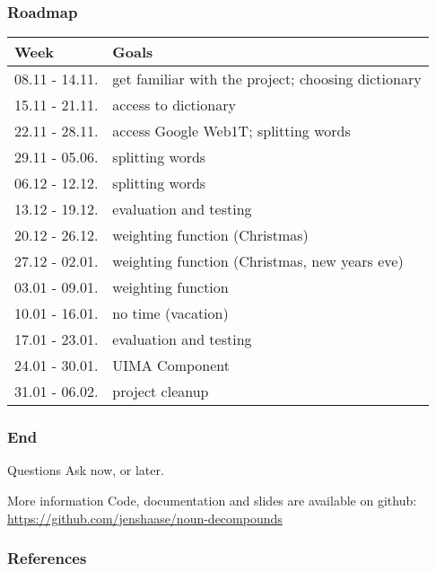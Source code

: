 \documentclass[accentcolor=tud9b, colorbacktitle, inverttitle]{tudbeamer}
\begin{document}
\begin{frame}
  \frametitle{Roadmap}

  \begin{tabular}{|l|l|}
  \hline
  \textbf{Week} & \textbf{Goals} \\ \hline
  08.11 - 14.11. & get familiar with the project; choosing dictionary \\ \hline
  15.11 - 21.11. & access to dictionary \\ \hline
  22.11 - 28.11. & access Google Web1T; splitting words \\ \hline
  29.11 - 05.06. & splitting words \\ \hline
  06.12 - 12.12. & splitting words \\ \hline
  13.12 - 19.12. & evaluation and testing \\ \hline
  20.12 - 26.12. & weighting function (Christmas) \\ \hline
  27.12 - 02.01. & weighting function (Christmas, new years eve) \\ \hline
  03.01 - 09.01. & weighting function \\ \hline
  10.01 - 16.01. & no time (vacation) \\ \hline
  17.01 - 23.01. & evaluation and testing \\ \hline
  24.01 - 30.01. & UIMA Component \\ \hline
  31.01 - 06.02. & project cleanup \\
  \hline
  \end{tabular}
\end{frame}

\begin{frame}
  \frametitle{End}
  
\begin{block}{Questions}
  Ask now, or later.
\end{block}

\begin{block}{More information}
  Code, documentation and slides are available on github: \url{https://github.com/jenshaase/noun-decompounds}
\end{block}
\end{frame}

\begin{frame}
  \frametitle{References}
  
  
  

\end{frame}
\end{document}
